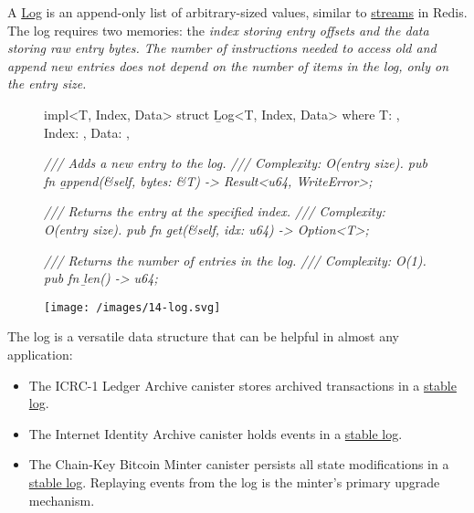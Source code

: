 \documentclass{article}
\begin{document}
A \href{https://docs.rs/ic-stable-structures/latest/ic_stable_structures/log/struct.Log.html}{Log} is an append-only list of arbitrary-sized values, similar to \href{https://redis.io/docs/data-types/streams/}{streams} in Redis.
The log requires two memories: the \em{index} storing entry offsets and the \em{data} storing raw entry bytes.
The number of instructions needed to access old and append new entries does not depend on the number of items in the log, only on the entry size.

\begin{figure}
\begin{code}[rust]
impl<T, Index, Data> struct \b{Log}<T, Index, Data>
where
  T: \href{#storable-trait}{},
  Index: \href{#memory}{},
  Data: \href{#memory}{},
{
    \em{/// Adds a new entry to the log.}
    \em{/// Complexity: O(entry size).}
    pub fn \b{append}(&self, bytes: &T) -> Result<u64, WriteError>;

    \em{/// Returns the entry at the specified index.}
    \em{/// Complexity: O(entry size).}
    pub fn \b{get}(&self, idx: u64) -> Option<T>;

    \em{/// Returns the number of entries in the log.}
    \em{/// Complexity: O(1).}
    pub fn \b{len}() -> u64;
}
\end{code}
\end{figure}
\begin{figure}[grayscale-diagram]
  \texttt{[image: /images/14-log.svg]}
\end{figure}

The log is a versatile data structure that can be helpful in almost any application:
\begin{itemize}
  \item
    The ICRC-1 Ledger Archive canister stores archived transactions in a \href{https://github.com/dfinity/ic/blob/9cdb1e62bcd199f28ae0005ed3f762487a1454df/rs/rosetta-api/icrc1/archive/src/main.rs#L58}{stable log}.
  \item
    The Internet Identity Archive canister holds events in a \href{https://github.com/dfinity/internet-identity/blob/b66fe925fb0a337b09aaaa5beaf1a60994b19f14/src/archive/src/main.rs#L90}{stable log}.
  \item
    The Chain-Key Bitcoin Minter canister persists all state modifications in a \href{https://github.com/dfinity/ic/blob/6cc83edf2cad91ca1bdbe8f7965060a9ef1d1960/rs/bitcoin/ckbtc/minter/src/storage.rs#L21}{stable log}.
    Replaying events from the log is the minter's primary upgrade mechanism.
\end{itemize}
\end{document}
